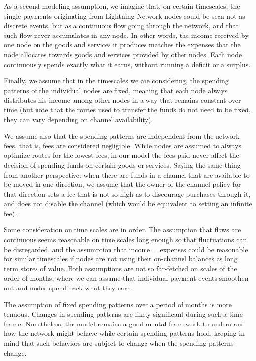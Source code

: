 \documentclass[a4paper]{article}
\begin{document}
As a second modeling assumption, we imagine that, on certain timescales, the single payments originating from Lightning Network nodes could be seen not as discrete events, but as a continuous flow going through the network, and that such flow never accumulates in any node. In other words, the income received by one node on the goods and services it produces matches the expenses that the node allocates towards goods and services provided by other nodes. Each node continuously spends exactly what it earns, without running a deficit or a surplus.

Finally, we assume that in the timescales we are considering, the spending patterns of the individual nodes are fixed, meaning that each node always distributes his income among other nodes in a way that remains constant over time (but note that the routes used to transfer the funds do not need to be fixed, they can vary depending on channel availability).

We assume also that the spending patterns are independent from the network fees, that is, fees are considered negligible. While nodes are assumed to always optimize routes for the lowest fees, in our model the fees paid never affect the decision of spending funds on certain goods or services. Saying the same thing from another perspective: when there are funds in a channel that are available to be moved in one direction, we assume that the owner of the channel policy for that direction sets a fee that is not so high as to discourage purchases through it, and does not disable the channel (which would be equivalent to setting an infinite fee).

Some consideration on time scales are in order. The assumption that flows are continuous seems reasonable on time scales long enough so that fluctuations can be disregarded, and the assumption that income = expenses could be reasonable for similar timescales if nodes are not using their on-channel balances as long term stores of value. Both assumptions are not so far-fetched on scales of the order of months, where we can assume that individual payment events smoothen out and nodes spend back what they earn.

The assumption of fixed spending patterns over a period of months is more tenuous. Changes in spending patterns are likely significant during such a time frame. Nonetheless, the model remains a good mental framework to understand how the network might behave while certain spending patterns hold, keeping in mind that such behaviors are subject to change when the spending patterns change.
\end{document}

